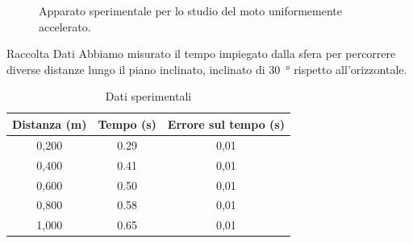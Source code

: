 \documentclass[12pt,a4paper,oneside]{book}
\makeatletter
\renewcommand{\subsection}{\@startsection {subsection}{2}{\z@}
{-3ex \@plus -0.1ex \@minus -.4ex}
{0.5ex \@plus.2ex }
{\color[rgb]{0.141,0.596,0.749}\normalfont\sffamily\bfseries}}
\theoremstyle{esercizio}
\makeatother
\begin{document}
\begin{figure}[!htbp] 
    \centering
    \caption{Apparato sperimentale per lo studio del moto uniformemente accelerato.}
    \label{fig:apparato}
\end{figure}

\subsection{Raccolta Dati}
Abbiamo misurato il tempo impiegato dalla sfera per percorrere diverse distanze lungo il piano inclinato, inclinato di \SI{30}{\degree} rispetto all'orizzontale.

\begin{table}[!htbp] 
    \centering
    \begin{tabular}{@{}ccc@{}}
        \toprule
        Distanza (\si{\metre}) & Tempo (\si{\second}) & Errore sul tempo (\si{\second}) \\
        \midrule
        0,200 & 0.29 & 0,01 \\
        0,400 & 0.41 & 0,01 \\
        0,600 & 0.50 & 0,01 \\
        0,800 & 0.58 & 0,01 \\
        1,000 & 0.65 & 0,01 \\
        \bottomrule
    \end{tabular}
    \caption{Dati sperimentali}
    \label{tab:datitab}
\end{table}
\end{document}
